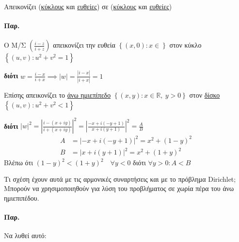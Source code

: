 \documentclass[12pt,a4paper,notitlepage,fleqn]{article}
\begin{document}
    Απεικονίζει (\underline{κύκλους} και \underline{ευθείες}) σε
    (\underline{κύκλους} και \underline{ευθείες})

    \paragraph{Παρ.}
    Ο Μ/Σ \( \displaystyle \left( \frac{i-z}{i+z} \right) \)
    απεικονίζει την ευθεία \( \left\lbrace (x,0): x\in \right\rbrace \)
    στον κύκλο \( \left\lbrace (u,v):u^2+v^2=1 \right\rbrace \)

    \textbf{διότι} \( w=\frac{i-x}{i+x} \implies |w| = \frac{|i-x|}{|i+x|} = 1 \)

    Επίσης απεικονίζει το \underline{άνω ημιεπίπεδο} \( \left\lbrace
    (x,y) : x \in \mathbb R,\ y > 0
     \right\rbrace \) στον \underline{δίσκο} \( \left\lbrace
     (u,v) : u^2+v^2 < 1
      \right\rbrace \)

    \textbf{διότι}
    \(  \displaystyle
    |w|^2 = \left|
    \frac{i-(x+iy)}{i+(x+iy)}
    \right|^2 = \left|
    \frac{-x+i(-y+1)}{x+i(y+1)}
    \right|^2 = \frac{A}{B}
     \)
    \begin{align*}
    	A &= \left|-x+i(-y+1)\right|^2 = x^2 + (1-y)^2 \\
    	B &= \left|x+i(y+1)\right|^2 = x^2 + (1+y)^2
    \end{align*}
    Βλέπω ότι \( (1-y)^2 < (1+y)^2 \quad \forall y<0 \) διότι \( \forall y>0:A<B \)

    Τι σχέση έχουν αυτά με τις αρμονικές συναρτήσεις και με το πρόβλημα Dirichlet;
    Μπορούν να χρησιμοποιηθούν για λύση του προβλήματος σε χωρία πέρα του άνω ημιεπιπέδου.

    \paragraph{Παρ.}
    Να λυθεί αυτό:
\end{document}

